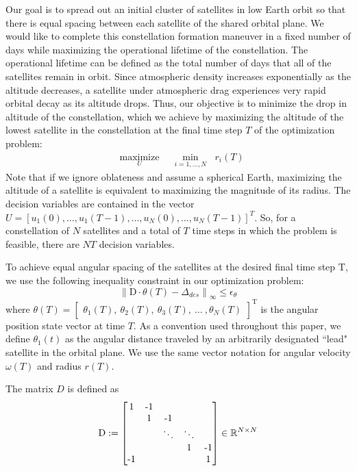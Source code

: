 \documentclass[letterpaper, 10 pt, conference]{ieeeconf}  %
\begin{document}
Our goal is to spread out an initial cluster of satellites in low Earth orbit so that there is equal spacing between each satellite of the shared orbital plane. We would like to complete this constellation formation maneuver in a fixed number of days while maximizing the operational lifetime of the constellation. The operational lifetime can be defined as the total number of days that all of the satellites remain in orbit. Since atmospheric density increases exponentially as the altitude decreases, a satellite under atmospheric drag experiences very rapid orbital decay as its altitude drops. Thus, our objective is to minimize the drop in altitude of the constellation, which we achieve by maximizing the altitude of the lowest satellite in the constellation at the final time step $T$ of the optimization problem:
\begin{equation}
\begin{aligned}
& \underset{U}{\text{maximize}}
& & \underset{i = 1, \ldots, N}{\text{min}}  \ \ \ \ r_i(T)
\end{aligned}
\end{equation}
Note that if we ignore oblateness and assume a spherical Earth, maximizing the altitude of a satellite is equivalent to maximizing the magnitude of its radius. The decision variables are contained in the vector $U = [u_1(0),\ldots,u_1(T-1),\ldots,u_N(0),\ldots,u_N(T-1)]^T$. So, for a constellation of $N$ satellites and a total of $T$ time steps in which the problem is feasible, there are $NT$ decision variables.

To achieve equal angular spacing of the satellites at the desired final time step $\text{T}$, we use the following inequality constraint in our optimization problem:
\begin{equation}
{\lVert \text{D} \cdot \theta(T) - \Delta_{des} \rVert}_{\infty} \leq \epsilon_{\theta} 
\end{equation}
where $\theta(T) = \begin{bmatrix} \theta_1(T), \ \theta_2(T), \ \theta_3(T), \ \hdots \ , \theta_N(T) \end{bmatrix}^\text{T}$ is the angular position state vector at time $T$. As a convention used throughout this paper, we define $\theta_1(t)$ as the angular distance traveled by an arbitrarily designated ``lead" satellite in the orbital plane. We use the same vector notation for angular velocity $\omega(T)$ and radius $r(T)$.

The matrix $D$ is defined as
\begin{equation}
\text{D} :=
\begin{bmatrix}
     1& $-$1&          &         &            \\
       &      1&   $-$1&         &            \\
       &        &\ddots&\ddots&            \\
       &        &          &        1& $-$1   \\
 $-$1&       &          &          &      1   \\
\end{bmatrix} 
\in \mathbb{R}^{N\times N}
\end{equation}
\end{document}
